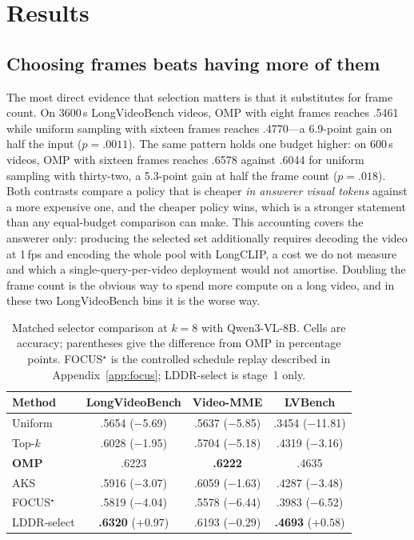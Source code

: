 \documentclass[11pt]{article}
\begin{document}
\section{Results}
\label{sec:results}

\subsection{Choosing frames beats having more of them}
\label{sec:selection}

The most direct evidence that selection matters is that it substitutes for frame count.
On 3600\,s LongVideoBench videos, OMP with eight frames reaches .5461 while uniform sampling with sixteen frames reaches .4770---a 6.9-point gain on half the input ($p{=}.0011$).
The same pattern holds one budget higher: on 600\,s videos, OMP with sixteen frames reaches .6578 against .6044 for uniform sampling with thirty-two, a 5.3-point gain at half the frame count ($p{=}.018$).
Both contrasts compare a policy that is cheaper \emph{in answerer visual tokens} against a more expensive one, and the cheaper policy wins, which is a stronger statement than any equal-budget comparison can make.
This accounting covers the answerer only: producing the selected set additionally requires decoding the video at 1\,fps and encoding the whole pool with LongCLIP, a cost we do not measure and which a single-query-per-video deployment would not amortise.
Doubling the frame count is the obvious way to spend more compute on a long video, and in these two LongVideoBench bins it is the worse way.

\begin{table}[t]
\centering
\small
\begin{tabular}{lccc}
\toprule
Method & LongVideoBench & Video-MME & LVBench \\
\midrule
Uniform & .5654 ($-$5.69) & .5637 ($-$5.85) & .3454 ($-$11.81) \\
Top-$k$ & .6028 ($-$1.95) & .5704 ($-$5.18) & .4319 ($-$3.16) \\
\textbf{OMP} & .6223 & \textbf{.6222} & .4635 \\
AKS & .5916 ($-$3.07) & .6059 ($-$1.63) & .4287 ($-$3.48) \\
FOCUS$^\star$ & .5819 ($-$4.04) & .5578 ($-$6.44) & .3983 ($-$6.52) \\
LDDR-select & \textbf{.6320} (${+}0.97$) & .6193 ($-$0.29) & \textbf{.4693} (${+}0.58$) \\
\bottomrule
\end{tabular}
\caption{Matched selector comparison at $k{=}8$ with Qwen3-VL-8B. Cells are accuracy; parentheses give the difference from OMP in percentage points. FOCUS$^\star$ is the controlled schedule replay described in Appendix~\ref{app:focus}; LDDR-select is stage~1 only.}
\label{tab:t1}
\end{table}
\end{document}
